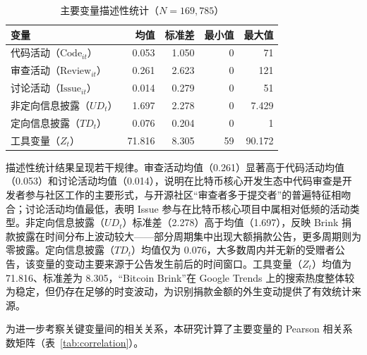 \begin{table}[htbp]
    \centering
    \caption{主要变量描述性统计（$N = 169{,}785$）}
    \label{tab:desc-stats}
    \begin{tabularx}{\textwidth}{Xrrrr}
        \toprule
        变量 & 均值 & 标准差 & 最小值 & 最大值 \\
        \midrule
        代码活动（$\text{Code}_{it}$）      & 0.053 & 1.050 & 0 & 71 \\
        审查活动（$\text{Review}_{it}$）    & 0.261 & 2.623 & 0 & 121 \\
        讨论活动（$\text{Issue}_{it}$）     & 0.014 & 0.279 & 0 & 51 \\
        非定向信息披露（$UD_t$） & 1.697 & 2.278 & 0 & 7.429 \\
        定向信息披露（$TD_t$） & 0.076 & 0.204 & 0 & 1 \\
        工具变量（$Z_t$） & 71.816 & 8.305 & 59 & 90.172 \\
        \bottomrule
    \end{tabularx}
\end{table}

描述性统计结果呈现若干规律。审查活动均值（0.261）显著高于代码活动均值（0.053）和讨论活动均值（0.014），说明在比特币核心开发生态中代码审查是开发者参与社区工作的主要形式，与开源社区“审查者多于提交者”的普遍特征相吻合；讨论活动均值最低，表明 Issue 参与在比特币核心项目中属相对低频的活动类型。非定向信息披露（$UD_t$）标准差（2.278）高于均值（1.697），反映 Brink 捐款披露在时间分布上波动较大——部分周期集中出现大额捐款公告，更多周期则为零披露。定向信息披露（$TD_t$）均值仅为 0.076，大多数周内并无新的受赠者公告，该变量的变动主要来源于公告发生前后的时间窗口。工具变量（$Z_t$）均值为 71.816、标准差为 8.305，“Bitcoin Brink”在 Google Trends 上的搜索热度整体较为稳定，但仍存在足够的时变波动，为识别捐款金额的外生变动提供了有效统计来源。

为进一步考察关键变量间的相关关系，本研究计算了主要变量的 Pearson 相关系数矩阵（表~\ref{tab:correlation}）。

